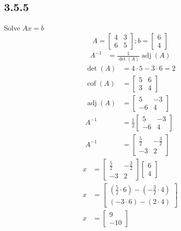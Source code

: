 \documentclass{article}
\DeclareMathOperator{\cof}{cof}
\DeclareMathOperator{\adj}{adj}
\begin{document}
\subsection{3.5.5}
Solve $ Ax = b $
\begin{equation*}
	A =
		\begin{bmatrix}
			4 & 3 \\
			6 & 5
		\end{bmatrix};
	b =
		\begin{bmatrix}
			6 \\
			4
		\end{bmatrix}
\end{equation*}
\begin{align*}
	A^{-1} & = \frac{1}{\det(A)}\adj(A)
\end{align*}
\begin{align*}
	\det(A) & = 4 \cdot 5 - 3 \cdot 6 = 2 \\
	\cof(A) & =
		\begin{bmatrix}
			5 & 6 \\
			3 & 4
		\end{bmatrix} \\
	\adj(A) & =
		\begin{bmatrix}
			5 & -3 \\
			-6 & 4
		\end{bmatrix} \\
	A^{-1} & = \frac{1}{2}
		\begin{bmatrix}
			5 & -3 \\
			-6 & 4
		\end{bmatrix} \\
	A^{-1} & =
		\begin{bmatrix}
			\frac{5}{2} & -\frac{3}{2} \\
			-3 & 2
		\end{bmatrix}
\end{align*}
\begin{align*}
	x & =
		\begin{bmatrix}
			\frac{5}{2} & -\frac{3}{2} \\
			-3 & 2
		\end{bmatrix}
		\begin{bmatrix}
			6 \\
			4
		\end{bmatrix} \\
	x & =
		\begin{bmatrix}
			(\frac{5}{2} \cdot 6) - (-\frac{3}{2} \cdot 4) \\
			(-3 \cdot 6) - (2 \cdot 4)
		\end{bmatrix} \\
	x & =
		\begin{bmatrix}
			9 \\
			-10
		\end{bmatrix}
\end{align*}
\end{document}
